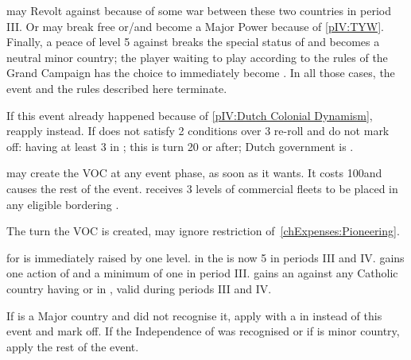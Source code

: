 \effetlong
\aparag \paysHollande may Revolt against \SPA because of some war between
these two countries in period III.
\aparag Or \paysHollande may break free or/and become a Major Power because of
\ref{pIV:TYW}.
\aparag Finally, a peace of level 5 against \SPA breaks the special status of
\VASSAL and \paysHollande becomes a neutral minor country; the player waiting
to play \HOL according to the rules of the Grand Campaign has the choice to
immediately become \HOL.
\aparag In all those cases, the event and the rules described here terminate.





\condition{}
\aparag If this event already happened because of \ref{pIV:Dutch Colonial
  Dynamism}, reapply  instead.
\aparag If \HOL does not satisfy 2 conditions over 3 re-roll and do not mark
off: having at least 3 \TP in ; this is turn 20 or after;
Dutch government is .

\phevnt
\aparag \HOL may create the VOC at any event phase, as soon as it wants. It
costs 100\ducats and causes the rest of the event.
\aparag \HOL receives 3 levels of commercial fleets to be placed in any
eligible \STZ bordering .

\phadm
\aparag The turn the VOC is created, \HOL may ignore restriction
of~\ref{chExpenses:Pioneering}.

\effetlong
\aparag \FTI for \HOL is immediately raised by one level. \FTI in the \ROTW is
now 5 in periods III and IV.
\aparag \HOL gains one action of \TP and a minimum of one \LeaderC in period
III.
\aparag \HOL gains an \OCB against any Catholic country having \TP or \COL in
, valid during periods III and IV.





\condition{}
\aparag If \HOL is a Major country and \SPA did not recognise it, apply \RD
with a \REVOLT in \SPA instead of this event and mark off.
\aparag If the Independence of \HOL was recognised or if \paysHollande is
minor country, apply the rest of the event.


